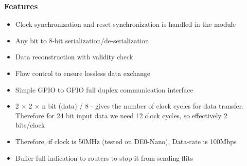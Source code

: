 \begin{frame}
\frametitle{Features}
\begin{itemize}
\item Clock synchronization and reset synchronization is handled in the module
\item Any bit to 8-bit serialization/de-serialization
\item Data reconstruction with validity check
\item Flow control to ensure lossless data exchange
\item Simple GPIO to GPIO full duplex communication interface
\item 2 $\times$ 2 $\times$ n bit (data) / 8 - gives the number of clock cycles for data transfer. Therefore for 24 bit input data we need 12 clock cycles, so effectively 2 bits/clock
\item Therefore, if clock is 50MHz (tested on DE0-Nano), Data-rate is 100Mbps
\item Buffer-full indication to routers to stop it from sending flits
\end{itemize}
\end{frame}


